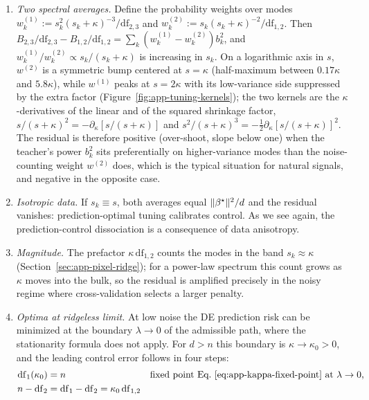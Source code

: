 \begin{remark}
\label{rem:app-tuning-remarks}
\leavevmode
\begin{enumerate}
\item \emph{Two spectral averages.}  Define the probability weights over
modes $w^{(1)}_k:=s_k^2(s_k+\kappa)^{-3}/\mathrm{df}_{2,3}$ and
$w^{(2)}_k:=s_k(s_k+\kappa)^{-2}/\mathrm{df}_{1,2}$.  Then
$B_{2,3}/\mathrm{df}_{2,3}-B_{1,2}/\mathrm{df}_{1,2}=\sum_k(w^{(1)}_k-w^{(2)}_k)b_k^2$,
and $w^{(1)}_k/w^{(2)}_k\propto s_k/(s_k+\kappa)$ is increasing in $s_k$.  On a logarithmic axis in $s$, $w^{(2)}$ is a symmetric bump centered at $s=\kappa$ (half-maximum between $0.17\kappa$ and $5.8\kappa$), while $w^{(1)}$ peaks at $s=2\kappa$ with its low-variance side suppressed by the extra factor (Figure~\ref{fig:app-tuning-kernels}); the two kernels are the $\kappa$-derivatives of the linear and of the squared shrinkage factor, $s/(s+\kappa)^2=-\partial_\kappa[s/(s+\kappa)]$ and $s^2/(s+\kappa)^3=-\tfrac12\partial_\kappa[s/(s+\kappa)]^2$.
The residual is therefore positive (over-shoot, slope below one) when the
teacher's power $b_k^2$ sits preferentially on higher-variance modes than the
noise-counting weight $w^{(2)}$ does, which is the typical situation for
natural signals, and negative in the opposite case.
\item \emph{Isotropic data.}  If $s_k\equiv s$, both averages equal
$\|{\beta^{\star}}\|^2/d$ and the residual vanishes: prediction-optimal tuning
calibrates control.  As we see again, the prediction-control dissociation is a consequence of data anisotropy.
\item \emph{Magnitude.}  The prefactor $\kappa\,\mathrm{df}_{1,2}$ counts the
modes in the band $s_k\approx\kappa$ (Section~\ref{sec:app-pixel-ridge}); for
a power-law spectrum this count grows as $\kappa$ moves into the bulk, so the
residual is amplified precisely in the noisy regime where cross-validation
selects a larger penalty.
\item \emph{Optima at ridgeless limit.}  At low noise the DE prediction risk can be
minimized at the boundary $\lambda\to0$ of the admissible path, where the
stationarity formula does not apply.  For $d>n$ this boundary is
$\kappa\to\kappa_0>0$, and the leading control error follows in four steps:
\begin{align*}
\mathrm{df}_1(\kappa_0)&=n
&&\text{fixed point Eq.~\ref{eq:app-kappa-fixed-point} at }\lambda\to0,\\
n-\mathrm{df}_2&=\mathrm{df}_1-\mathrm{df}_2=\kappa_0\,\mathrm{df}_{1,2}

\end{align*}
\end{enumerate}
\end{remark}
